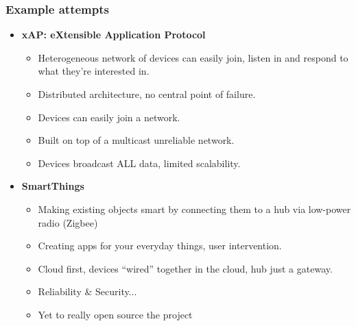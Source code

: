 \documentclass{beamer}
\begin{document}
\begin{frame}[t]\frametitle{Example attempts}

\begin{itemize}
    \item<1-> [--] \textbf{xAP: eXtensible Application Protocol}
  \begin{itemize}
    \item Heterogeneous network of devices can easily join, listen in and respond to what they're interested in.
    \item Distributed architecture, no central point of failure.
    \item Devices can easily join a network.
    \item Built on top of a multicast unreliable network.
    \item Devices broadcast ALL data, limited scalability.
  \end{itemize}
  \item<2-> [--] \textbf{SmartThings}
  \begin{itemize}
    \item Making existing objects smart by connecting them to a hub via low-power radio (Zigbee)
    \item Creating apps for your everyday things, user intervention.
    \item Cloud first, devices ``wired'' together in the cloud, hub just a gateway.
    \item Reliability \& Security...
    \item Yet to really open source the project
  \end{itemize}
\end{itemize}
\end{frame}
\end{document}
